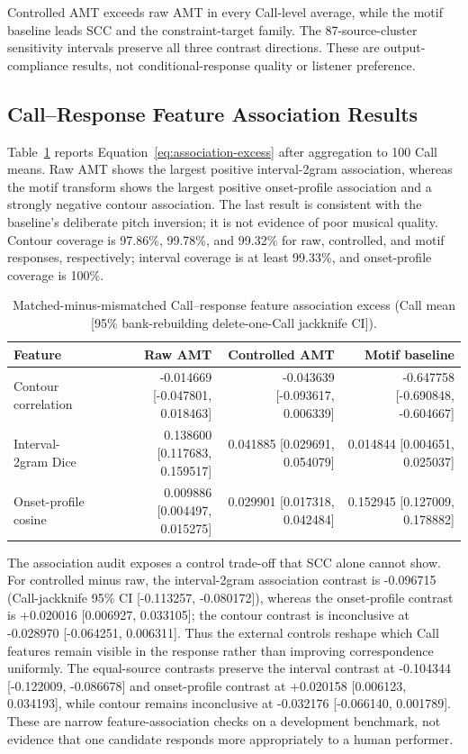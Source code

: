 \documentclass[11pt,a4paper]{article}
\begin{document}
Controlled AMT exceeds raw AMT in every Call-level average, while the motif baseline leads SCC and the constraint-target family. The 87-source-cluster sensitivity intervals preserve all three contrast directions. These are output-compliance results, not conditional-response quality or listener preference.

\subsection{Call--Response Feature Association Results}
\label{subsec:feature-association-results}

Table~\ref{tab:feature-association} reports Equation~\eqref{eq:association-excess} after aggregation to 100 Call means. Raw AMT shows the largest positive interval-2gram association, whereas the motif transform shows the largest positive onset-profile association and a strongly negative contour association. The last result is consistent with the baseline's deliberate pitch inversion; it is not evidence of poor musical quality. Contour coverage is 97.86\%, 99.78\%, and 99.32\% for raw, controlled, and motif responses, respectively; interval coverage is at least 99.33\%, and onset-profile coverage is 100\%.

\begin{table}[htbp]
\centering
\caption{Matched-minus-mismatched Call--response feature association excess (Call mean [95\% bank-rebuilding delete-one-Call jackknife CI]).}
\label{tab:feature-association}
\scriptsize
\setlength{\tabcolsep}{3pt}
\begin{tabular}{lrrr}
\toprule
Feature & Raw AMT & Controlled AMT & Motif baseline \\
\midrule
Contour correlation & -0.014669 [-0.047801, 0.018463] & -0.043639 [-0.093617, 0.006339] & -0.647758 [-0.690848, -0.604667] \\
Interval-2gram Dice & 0.138600 [0.117683, 0.159517] & 0.041885 [0.029691, 0.054079] & 0.014844 [0.004651, 0.025037] \\
Onset-profile cosine & 0.009886 [0.004497, 0.015275] & 0.029901 [0.017318, 0.042484] & 0.152945 [0.127009, 0.178882] \\
\bottomrule
\end{tabular}
\end{table}

The association audit exposes a control trade-off that SCC alone cannot show. For controlled minus raw, the interval-2gram association contrast is -0.096715 (Call-jackknife 95\% CI [-0.113257, -0.080172]), whereas the onset-profile contrast is +0.020016 [0.006927, 0.033105]; the contour contrast is inconclusive at -0.028970 [-0.064251, 0.006311]. Thus the external controls reshape which Call features remain visible in the response rather than improving correspondence uniformly. The equal-source contrasts preserve the interval contrast at -0.104344 [-0.122009, -0.086678] and onset-profile contrast at +0.020158 [0.006123, 0.034193], while contour remains inconclusive at -0.032176 [-0.066140, 0.001789]. These are narrow feature-association checks on a development benchmark, not evidence that one candidate responds more appropriately to a human performer.
\end{document}
